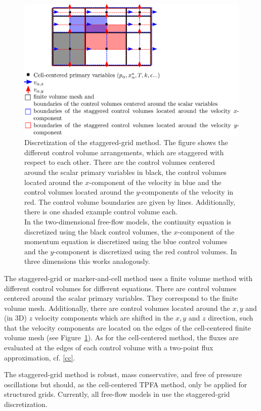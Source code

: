 \begin{figure}[ht]
\centering
\includegraphics[width=.8\linewidth]{./pdf/staggered_grid.pdf}
\caption{\label{pc:staggered} Discretization of the staggered-grid method. The figure shows the different control volume arrangements, which are staggered with respect to each other. There are the control volumes centered around the scalar primary variables in black, the control volumes located around the $x$-component of the velocity in blue and the control volumes located around the $y$-components of the velocity in red. The control volume boundaries are given by lines. Additionally, there is one shaded example control volume each.\\
In the two-dimensional free-flow models, the continuity equation is discretized using the black control volumes, the $x$-component of the momentum equation is discretized using the blue control volumes and the $y$-component is discretized using the red control volumes. In three dimensions this works analogously.}
\end{figure}

The staggered-grid or marker-and-cell method uses a finite volume method with different control volumes for different equations. There are control volumes centered around the scalar primary variables. They correspond to the finite volume mesh. Additionally, there are control volumes located around the $x,y$ and (in 3D) $z$ velocity components which are shifted in the $x,y$ and $z$ direction, such that the velocity components are located on the edges of the cell-centered finite volume mesh (see Figure~\ref{pc:staggered}). As for the cell-centered method, the fluxes are evaluated at the edges of each control volume with a two-point flux approximation, cf. \ref{cc}.\par
The staggered-grid method is robust, mass conservative, and free of pressure oscillations
but should, as the cell-centered TPFA method, only be applied for structured grids.
Currently, all free-flow models in \Dumux use the staggered-grid discretization.
